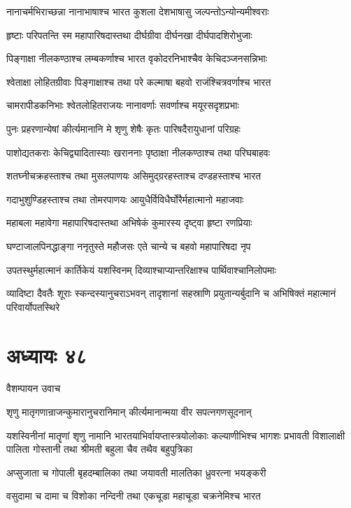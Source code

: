 \twolineshloka
{नानाचर्मभिराच्छन्ना नानाभाषाश्च भारत}
{कुशला देशभाषासु जल्पन्तोऽन्योन्यमीश्वराः}


\twolineshloka
{हृष्टाः परिपतन्ति स्म महापारिषदास्तथा}
{दीर्घग्रीवा दीर्घनखा दीर्घपादशिरोभुजाः}


\twolineshloka
{पिङ्गाक्षा नीलकण्ठाश्च लम्बकर्णाश्च भारत}
{वृकोदरनिभाश्चैव केचिदञ्जनसन्निभाः}


\twolineshloka
{श्वेताक्षा लोहितग्रीवाः पिङ्गाक्षाश्च तथा परे}
{कल्माषा बहवो राजंश्चित्रवर्णाश्च भारत}


\twolineshloka
{चामरापीडकनिभाः श्वेतलोहितराजयः}
{नानावर्णाः सवर्णाश्च मयूरसदृशप्रभाः}


\twolineshloka
{पुनः प्रहरणान्येषां कीर्त्यमानानि मे शृणु}
{शेषैः कृतः पारिषदैरायुधानां परिग्रहः}


\twolineshloka
{पाशोद्यतकराः केचिद्व्यादितास्याः खराननाः}
{पृष्ठाक्षा नीलकण्ठाश्च तथा परिघबाहवः}


\twolineshloka
{शतघ्नीचक्रहस्ताश्च तथा मुसलपाणयः}
{असिमुद्ग्ररहस्ताश्च दण्डहस्ताश्च भारत}


\twolineshloka
{गदाभुशुण्डिहस्ताश्च तथा तोमरपाणयः}
{आयुधैर्विविधैर्घोरैर्महात्मानो महाजवाः}


\twolineshloka
{महाबला महावेगा महापारिषदास्तथा}
{अभिषेकं कुमारस्य दृष्ट्वा हृष्टा रणप्रियाः}


\twolineshloka
{घण्टाजालपिनद्धाङ्गा ननृतुस्ते महौजसः}
{एते चान्ये च बहवो महापारिषदा नृप}


\twolineshloka
{उपतस्थुर्महात्मानं कार्तिकेयं यशस्विनम्}
{दिव्याश्चाप्यान्तरिक्षाश्च पार्थिवाश्चानिलोपमाः}


\threelineshloka
{व्यादिष्टा दैवतैः शूराः स्कन्दस्यानुचराऽभवन्}
{तादृशानां सहस्राणि प्रयुतान्यर्बुदानि च}
{अभिषिक्तं महात्मानं परिवार्योपतस्थिरे}


\chapter{अध्यायः ४८}
\twolineshloka
{वैशम्पायन उवाच}
{}


\twolineshloka
{शृणु मातृगणान्राजन्कुमारानुचरानिमान्}
{कीर्त्यमानान्मया वीर सपत्नगणसूदनान्}


यशस्विनीनां मातॄणां शृणु नामानि भारतयाभिर्वायप्तास्त्रयोलोकाः कल्याणीभिश्च भागशः
\twolineshloka
{प्रभावती विशालाक्षी पालिता गोस्तानी तथा}
{श्रीमती बहुला चैव तथैव बहुपुत्रिका}


\twolineshloka
{अप्सुजाता च गोपाली बृहदम्बालिका तथा}
{जयावती मालतिका ध्रुवरत्ना भयङ्करी}


\twolineshloka
{वसुदामा च दामा च विशोका नन्दिनी तथा}
{एकचूडा महाचूडा चक्रनेमिश्च भारत}


